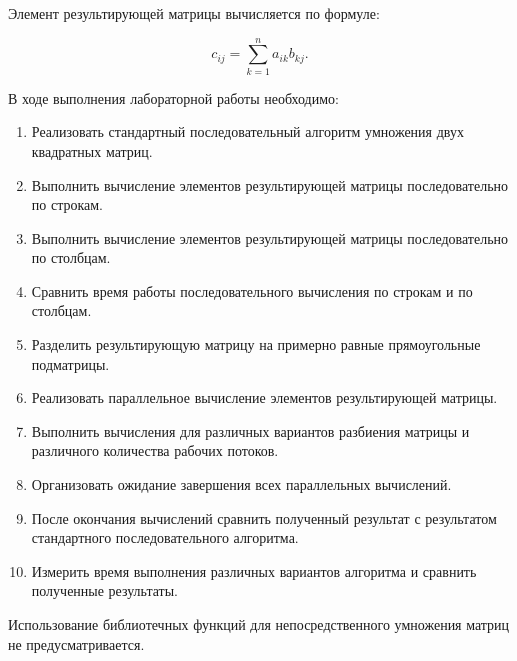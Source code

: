 \documentclass[a4paper, 14pt]{extarticle}
\begin{document}
Элемент результирующей матрицы вычисляется по формуле:

\[
c_{ij}
=
\sum_{k=1}^{n}
a_{ik}b_{kj}.
\]

В ходе выполнения лабораторной работы необходимо:

\begin{enumerate}[
    label=\arabic*.,
    itemsep=0pt,
    topsep=3pt,
    parsep=0pt,
    partopsep=0pt
]

    \item Реализовать стандартный последовательный алгоритм
    умножения двух квадратных матриц.

    \item Выполнить вычисление элементов результирующей матрицы
    последовательно по строкам.

    \item Выполнить вычисление элементов результирующей матрицы
    последовательно по столбцам.

    \item Сравнить время работы последовательного вычисления
    по строкам и по столбцам.

    \item Разделить результирующую матрицу на примерно равные
    прямоугольные подматрицы.

    \item Реализовать параллельное вычисление элементов
    результирующей матрицы.

    \item Выполнить вычисления для различных вариантов разбиения
    матрицы и различного количества рабочих потоков.

    \item Организовать ожидание завершения всех параллельных
    вычислений.

    \item После окончания вычислений сравнить полученный результат
    с результатом стандартного последовательного алгоритма.

    \item Измерить время выполнения различных вариантов алгоритма
    и сравнить полученные результаты.

\end{enumerate}

Использование библиотечных функций для непосредственного
умножения матриц не предусматривается.


\end{document}

